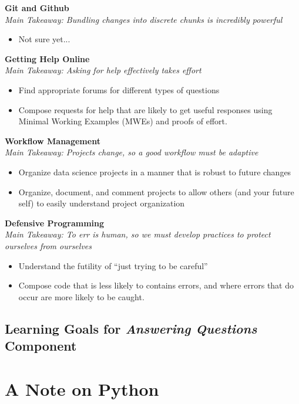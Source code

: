 \documentclass[12pt]{article}
\begin{document}
\textbf{Git and Github}\\
\emph{Main Takeaway: Bundling changes into discrete chunks is incredibly powerful}
\begin{itemize}
	\item Not sure yet...
\end{itemize}


\textbf{Getting Help Online}\\
\emph{Main Takeaway: Asking for help effectively takes effort}
\begin{itemize}
	\item Find appropriate forums for different types of questions
	\item Compose requests for help that are likely to get useful responses using Minimal Working Examples (MWEs) and proofs of effort.
\end{itemize}

\textbf{Workflow Management}\\
\emph{Main Takeaway: Projects change, so a good workflow must be adaptive}
\begin{itemize}
	\item Organize data science projects in a manner that is robust to future changes
	\item Organize, document, and comment projects to allow others (and your future self) to easily understand project organization
\end{itemize}

\textbf{Defensive Programming}\\
\emph{Main Takeaway: To err is human, so we must develop practices to protect ourselves from ourselves}
\begin{itemize}
	\item Understand the futility of ``just trying to be careful''
	\item Compose code that is less likely to contains errors, and where errors that do occur are more likely to be caught.
\end{itemize}

\subsection{Learning Goals for \emph{Answering Questions} Component}

\section{A Note on Python}
\end{document}

